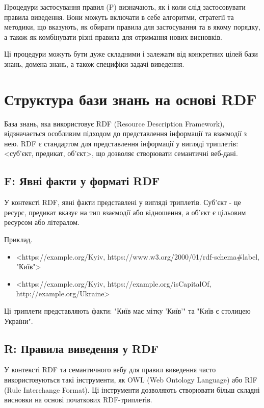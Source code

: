 \documentclass[12pt, a4paper]{article}
\begin{document}
Процедури застосування правил (P) визначають, як і коли слід застосовувати правила виведення. Вони можуть включати в себе алгоритми, стратегії та методики, що вказують, як обирати правила для застосування та в якому порядку, а також як комбінувати різні правила для отримання нових висновків.

Ці процедури можуть бути дуже складними і залежати від конкретних цілей бази знань, домена знань, а також специфіки задачі виведення.

\section{Структура бази знань на основі RDF}

База знань, яка використовує RDF (Resource Description Framework), відзначається особливим підходом до представлення інформації та взаємодії з нею. RDF є стандартом для представлення інформації у вигляді триплетів: <суб'єкт, предикат, об'єкт>, що дозволяє створювати семантичні веб-дані.

\subsection{F: Явні факти у форматі RDF}

У контексті RDF, явні факти представлені у вигляді триплетів. Суб'єкт - це ресурс, предикат вказує на тип взаємодії або відношення, а об'єкт є цільовим ресурсом або літералом.

Приклад.

\begin{itemize}
    \item <https://example.org/Kyiv, https://www.w3.org/2000/01/rdf-schema#label, "Київ">
    \item <https://example.org/Kyiv, https://example.org/isCapitalOf, http://example.org/Ukraine>
\end{itemize}

Ці триплети представляють факти: "Київ має мітку 'Київ'" та "Київ є столицею України".

\subsection{R: Правила виведення у RDF}

У контексті RDF та семантичного вебу для правил виведення часто використовуються такі інструменти, як OWL (Web Ontology Language) або RIF (Rule Interchange Format). Ці інструменти дозволяють створювати більш складні висновки на основі початкових RDF-триплетів.
\end{document}
